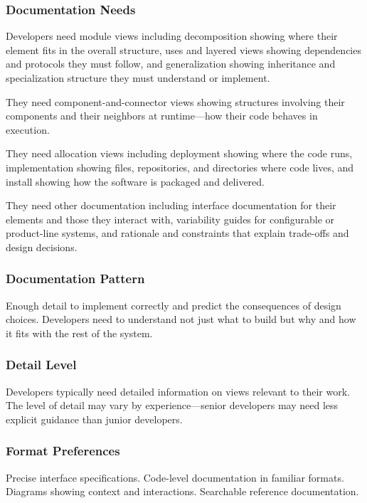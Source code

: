 \documentclass[11pt]{article}
\begin{document}
\subsubsection{Documentation Needs}

Developers need module views including decomposition showing where their element fits in the overall structure, uses and layered views showing dependencies and protocols they must follow, and generalization showing inheritance and specialization structure they must understand or implement.

They need component-and-connector views showing structures involving their components and their neighbors at runtime---how their code behaves in execution.

They need allocation views including deployment showing where the code runs, implementation showing files, repositories, and directories where code lives, and install showing how the software is packaged and delivered.

They need other documentation including interface documentation for their elements and those they interact with, variability guides for configurable or product-line systems, and rationale and constraints that explain trade-offs and design decisions.

\subsubsection{Documentation Pattern}

Enough detail to implement correctly and predict the consequences of design choices. Developers need to understand not just what to build but why and how it fits with the rest of the system.

\subsubsection{Detail Level}

Developers typically need detailed information on views relevant to their work. The level of detail may vary by experience---senior developers may need less explicit guidance than junior developers.

\subsubsection{Format Preferences}

Precise interface specifications. Code-level documentation in familiar formats. Diagrams showing context and interactions. Searchable reference documentation.
\end{document}
